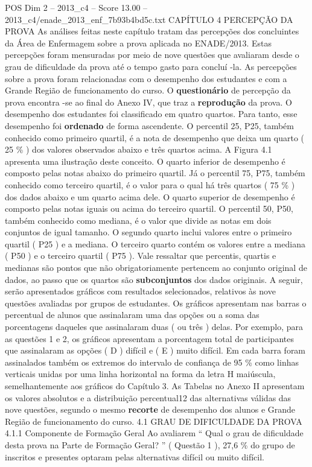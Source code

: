 \begin{textsample}{POS Dim 2 – 2013\_c4 – Score 13.00 – 2013\_c4/enade\_2013\_enf\_7b93b4bd5c.txt}  \label{ex:f2_pos_061}
CAPÍTULO 4 PERCEPÇÃO DA PROVA As análises feitas neste capítulo tratam das percepções dos concluintes da Área de Enfermagem sobre a prova aplicada no ENADE/2013.
Estas percepções foram mensuradas por meio de nove questões que avaliaram desde o grau de dificuldade da prova até o tempo gasto para concluí -la.
As percepções sobre a prova foram relacionadas com o desempenho dos estudantes e com a Grande Região de funcionamento do curso.
O \textbf{questionário} de percepção da prova encontra -se ao final do Anexo IV, que traz a \textbf{reprodução} da prova.
O desempenho dos estudantes foi classificado em quatro quartos.
Para tanto, esse desempenho foi \textbf{ordenado} de forma ascendente.
O percentil 25, P25, também conhecido como primeiro quartil, é a nota de desempenho que deixa um quarto ( 25 \% ) dos valores observados abaixo e três quartos acima.
A Figura 4.1 apresenta uma ilustração deste conceito.
O quarto inferior de desempenho é composto pelas notas abaixo do primeiro quartil.
Já o percentil 75, P75, também conhecido como terceiro quartil, é o valor para o qual há três quartos ( 75 \% ) dos dados abaixo e um quarto acima dele.
O quarto superior de desempenho é composto pelas notas iguais ou acima do terceiro quartil.
O percentil 50, P50, também conhecido como mediana, é o valor que divide as notas em dois conjuntos de igual tamanho.
O segundo quarto inclui valores entre o primeiro quartil ( P25 ) e a mediana.
O terceiro quarto contém os valores entre a mediana ( P50 ) e o terceiro quartil ( P75 ).
Vale ressaltar que percentis, quartis e medianas são pontos que não obrigatoriamente pertencem ao conjunto original de dados, ao passo que os quartos são \textbf{subconjuntos} dos dados originais.
A seguir, serão apresentados gráficos com resultados selecionados, relativos às nove questões avaliadas por grupos de estudantes.
Os gráficos apresentam nas barras o percentual de alunos que assinalaram uma das opções ou a soma das porcentagens daqueles que assinalaram duas ( ou três ) delas.
Por exemplo, para as questões 1 e 2, os gráficos apresentam a porcentagem total de participantes que assinalaram as opções ( D ) difícil e ( E ) muito difícil.
Em cada barra foram assinalados também os extremos do intervalo de confiança de 95 \% como linhas verticais unidas por uma linha horizontal na forma da letra H maiúscula, semelhantemente aos gráficos do Capítulo 3.
As Tabelas no Anexo II apresentam os valores absolutos e a distribuição percentual12 das alternativas válidas das nove questões, segundo o mesmo \textbf{recorte} de desempenho dos alunos e Grande Região de funcionamento do curso. 4.1 GRAU DE DIFICULDADE DA PROVA 4.1.1 Componente de Formação Geral Ao avaliarem “ Qual o grau de dificuldade desta prova na Parte de Formação Geral? ” ( Questão 1 ), 27,6 \% do grupo de inscritos e presentes optaram pelas alternativas difícil ou muito difícil.

\end{textsample}
